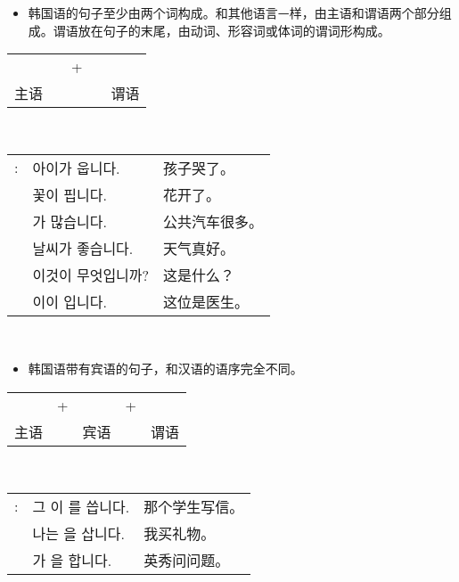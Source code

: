 \begin{grammar}
    \begin{grammarsect}[句子结构]
    \begin{itemize}
        \item 韩国语的句子至少由两个词构成。和其他语言ᅳ样，由主语和谓语两个部分组成。谓语放在句子的末尾，由动词、形容词或体词的谓词形构成。
    \end{itemize}
    \begin{center}
    \begin{tabular}{lllll}
        \kr \ruby{主語}{주어}&\qquad&+&\qquad&\kr \ruby{敘述語}{서술어}\\
        主语&\qquad&&\qquad&谓语
    \end{tabular}\\
    \end{center}
    \begin{tabular}{lll}
        \kr \ruby{例}{예}: &\kr 아이가 웁니다.&孩子哭了。\\
        &\kr 꽃이 핍니다.&花开了。\\
        &\kr \ruby{버스}{bus}가 많습니다.&公共汽车很多。\\
        &\kr 날씨가 좋습니다.&天气真好。\\
        &\kr 이것이 무엇입니까?&这是什么？\\
        &\kr 이\ruby{分}{분}이 \ruby{醫師}{의사}입니다.&这位是医生。
    \end{tabular}\\
    \end{grammarsect}
    \begin{itemize}
        \item 韩国语带有宾语的句子，和汉语的语序完全不同。
    \end{itemize}
    \begin{center}
    \begin{tabular}{lllll}
        \kr \ruby{主語}{주어}&+&\kr \ruby{目的語}{목적어}&+&\kr \ruby{敘述語}{서술어}\\
        主语&&宾语&&谓语
    \end{tabular}\\
    \end{center}
    \begin{tabular}{lll}
        \kr \ruby{例}{예}: &\kr 그 \ruby{學生}{학생}이 \ruby{便紙}{편지}를 씁니다.&那个学生写信。\\
        &\kr 나는 \ruby{膳物}{선물}을 삽니다.&我买礼物。\\
        &\kr \ruby{英秀}{영수}가 \ruby{質問}{질문}을 합니다.&英秀问问题。
    \end{tabular}\\
\end{grammar}
